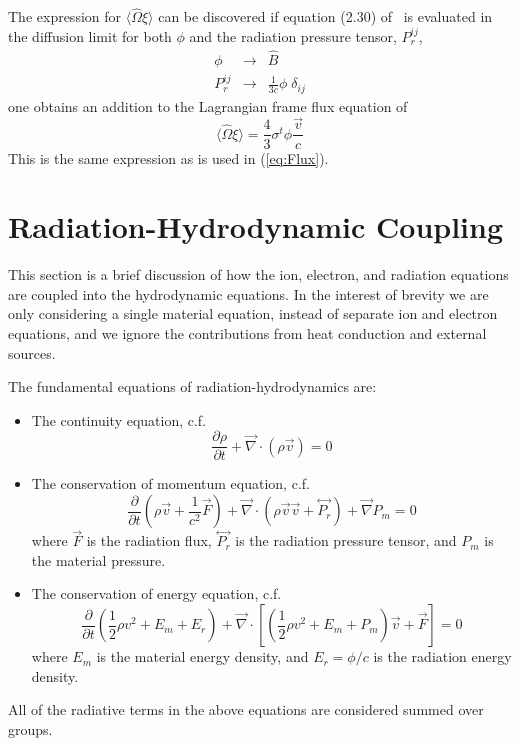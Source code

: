 \documentclass{article}
\newcommand{\partl}[2]{\ensuremath{\frac{\partial{#1}}{\partial{#2}}}}\newcommand{\del}{\ensuremath{\vec{\nabla}}}
\newcommand{\tensor}[1]{\ensuremath{\stackrel{\leftrightarrow}{#1}}}
\begin{document}
The expression for $\langle \hat{\Omega} \xi \rangle$ can be discovered
if equation (2.30) of~\cite{MihalasKlein} is evaluated in the diffusion limit
for both $\phi$ and the radiation pressure tensor, $P_{r}^{ij}$,
\begin{eqnarray}
        \phi &\rightarrow& \hat{B} \\
        P_{r}^{ij} &\rightarrow& \frac{1}{3c} \phi \; \delta_{ij} 
\end{eqnarray}
one obtains an addition to the Lagrangian frame flux equation of
\begin{equation}
        \langle \hat{\Omega} \xi \rangle = 
                \frac{4}{3} \sigma^{t} \phi \frac{\vec{v}}{c}
\end{equation}
This is the same expression as is used in (\ref{eq:Flux}).

\section{Radiation-Hydrodynamic Coupling}

This section is a brief discussion of how the ion, electron, and radiation
equations are coupled into the hydrodynamic equations.
In the interest of brevity we are only considering a single material equation,
instead of separate ion and electron equations, and we ignore the contributions
from heat conduction and external sources.

The fundamental equations of radiation-hydrodynamics are:
\begin{itemize}
  \item The continuity equation, c.f.\ \cite[Eq.~(16)]{PomraningLAUR}
     \begin{equation}
        \partl{\rho}{t} + \del \cdot (\rho \vec{v}) = 0
     \label{eq:continuity}
     \end{equation}
  \item The conservation of momentum equation, c.f.\ \cite[Eq.~(17)]{PomraningLAUR}
     \begin{equation}
        \partl{}{t}\left( \rho \vec{v} + \frac{1}{c^2} \vec{F} \right)
         + \del \cdot \left( \rho \vec{v} \vec{v} + \tensor{P_{r}} \right)
         + \del P_{m}
         = 0
     \label{eq:momentum}
     \end{equation}
     where $\vec{F}$ is the radiation flux,
     $\tensor{P_{r}}$ is the radiation pressure tensor,
     and $P_{m}$ is the material pressure.
  \item The conservation of energy equation,
          c.f.\ \cite[Eq.~(18)]{PomraningLAUR}
     \begin{equation}
        \partl{}{t}\left( \frac{1}{2} \rho v^2
                          + E_{m} + E_{r} \right)
         + \del \cdot \left[
              \left( \frac{1}{2} \rho v^2 + E_{m} + P_{m} \right) \vec{v}
              + \vec{F} \right]
         = 0
     \label{eq:totalenergy}
     \end{equation}
     where $E_{m}$ is the material energy density, and $E_{r} = \phi / c$
     is the radiation energy density.
\end{itemize}
All of the radiative terms in the above equations are considered summed
over groups.
\end{document}
